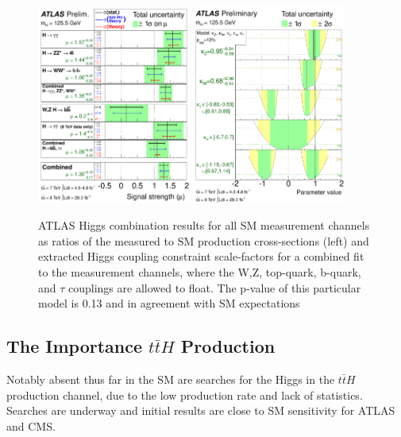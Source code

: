 \begin{figure}[!t]
\centering 
\includegraphics[width=0.45\textwidth]{figs/theory/atlas_higgs.pdf}
\includegraphics[width=0.45\textwidth]{figs/theory/atlas_coupling.pdf}
\caption {
  ATLAS Higgs combination results for all SM measurement channels as ratios of
  the measured to SM production cross-sections (left) and extracted Higgs
  coupling constraint scale-factors for a combined fit to the measurement
  channels, where the W,Z, top-quark, b-quark, and $\tau$ couplings are
  allowed to float. The p-value of this particular model is 0.13 and in agreement
  with SM expectations}

\label{figure:theory_higgsdisc}
\end{figure}


\subsection{The Importance $t\bar{t}H$ Production}

Notably absent thus far in the SM are searches for the Higgs in the $t\bar{t}H$
production channel, due to the low production rate and lack of statistics. Searches are underway and
initial results are close to SM sensitivity for ATLAS and CMS.

